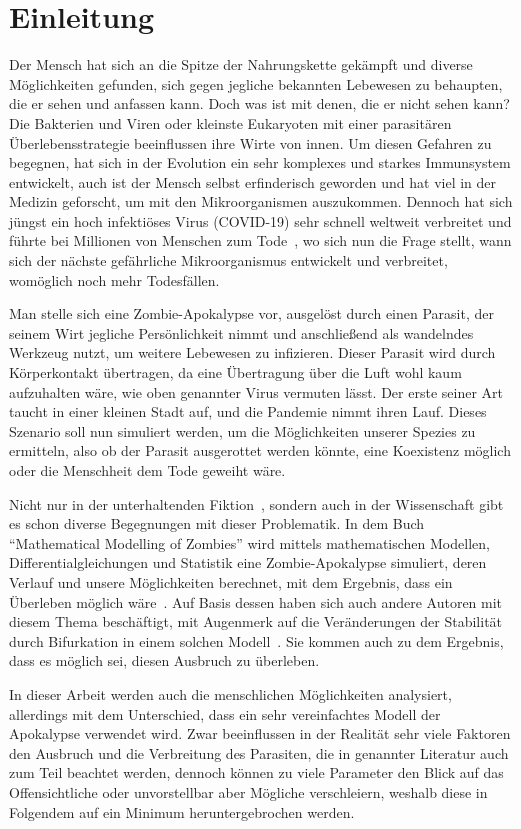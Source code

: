 \section{Einleitung} %
    \label{sec:einleitung}
    Der Mensch hat sich an die Spitze der Nahrungskette gekämpft und diverse Möglichkeiten gefunden, sich gegen jegliche bekannten Lebewesen zu behaupten, die er sehen und anfassen kann. Doch was ist mit denen, die er nicht sehen kann? Die Bakterien und Viren oder kleinste Eukaryoten mit einer parasitären Überlebensstrategie beeinflussen ihre Wirte von innen. Um diesen Gefahren zu begegnen, hat sich in der Evolution ein sehr komplexes und starkes Immunsystem entwickelt, auch ist der Mensch selbst erfinderisch geworden und hat viel in der Medizin geforscht, um mit den Mikroorganismen auszukommen. Dennoch hat sich jüngst ein hoch infektiöses Virus (COVID-19) sehr schnell weltweit verbreitet und führte bei Millionen von Menschen zum Tode\ \cite[vgl.][]{corona}, wo sich nun die Frage stellt, wann sich der nächste gefährliche Mikroorganismus entwickelt und verbreitet, womöglich noch mehr Todesfällen.

    Man stelle sich eine Zombie-Apokalypse vor, ausgelöst durch einen Parasit, der seinem Wirt jegliche Persönlichkeit nimmt und anschließend als wandelndes Werkzeug nutzt, um weitere Lebewesen zu infizieren. Dieser Parasit wird durch Körperkontakt übertragen, da eine Übertragung über die Luft wohl kaum aufzuhalten wäre, wie oben genannter Virus vermuten lässt. Der erste seiner Art taucht in einer kleinen Stadt auf, und die Pandemie nimmt ihren Lauf. Dieses Szenario soll nun simuliert werden, um die Möglichkeiten unserer Spezies zu ermitteln, also ob der Parasit ausgerottet werden könnte, eine Koexistenz möglich oder die Menschheit dem Tode geweiht wäre.

    Nicht nur in der unterhaltenden Fiktion\ \cite{zombie_fiction}, sondern auch in der Wissenschaft gibt es schon diverse Begegnungen mit dieser Problematik. In dem Buch ``Mathematical Modelling of Zombies'' wird mittels mathematischen Modellen, Differentialgleichungen und Statistik eine Zombie-Apokalypse simuliert, deren Verlauf und unsere Möglichkeiten berechnet, mit dem Ergebnis, dass ein Überleben möglich wäre\ \cite{zombie_smith}. Auf Basis dessen haben sich auch andere Autoren mit diesem Thema beschäftigt, mit Augenmerk auf die Veränderungen der Stabilität durch Bifurkation in einem solchen Modell\ \cite[vgl.][]{zombie_science2}. Sie kommen auch zu dem Ergebnis, dass es möglich sei, diesen Ausbruch zu überleben.

    In dieser Arbeit werden auch die menschlichen Möglichkeiten analysiert, allerdings mit dem Unterschied, dass ein sehr vereinfachtes Modell der Apokalypse verwendet wird. Zwar beeinflussen in der Realität sehr viele Faktoren den Ausbruch und die Verbreitung des Parasiten, die in genannter Literatur auch zum Teil beachtet werden, dennoch können zu viele Parameter den Blick auf das Offensichtliche oder unvorstellbar aber Mögliche verschleiern, weshalb diese in Folgendem auf ein Minimum heruntergebrochen werden.
